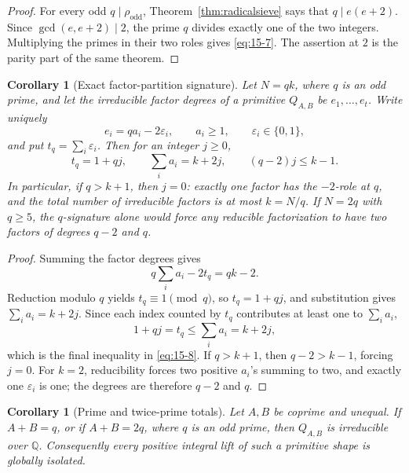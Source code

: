 \documentclass[11pt]{article}
\numberwithin{equation}{section}
\newtheorem{corollary}[theorem]{Corollary}
\theoremstyle{definition}
\newcommand{\Q}{\mathbb Q}
\begin{document}
\begin{proof}
For every odd \(q\mid\rho_{\mathrm{odd}}\),
Theorem~\ref{thm:radicalsieve} says that \(q\mid e(e+2)\).  Since
\(\gcd(e,e+2)\mid2\), the prime \(q\) divides exactly one of the two
integers.  Multiplying the primes in their two roles gives \eqref{eq:15-7}.  The
assertion at \(2\) is the parity part of the same theorem.
\end{proof}

\begin{corollary}[Exact factor-partition signature]
\label{cor:partitionsignature}
Let \(N=qk\), where \(q\) is an odd prime, and let the irreducible factor
degrees of a primitive \(Q_{A,B}\) be \(e_1,\ldots,e_t\).  Write uniquely
\[
 e_i=qa_i-2\varepsilon_i,
 \qquad a_i\geq1,
 \qquad \varepsilon_i\in\{0,1\},
\]
and put \(t_q=\sum_i\varepsilon_i\).  Then for an integer \(j\geq0\),
\begin{equation}
 t_q=1+qj,
 \qquad
 \sum_i a_i=k+2j,
 \qquad
 (q-2)j\leq k-1.
 \label{eq:15-8}
\end{equation}
In particular, if \(q>k+1\), then \(j=0\): exactly one factor has the
\(-2\)-role at \(q\), and the total number of irreducible factors is at
most \(k=N/q\).  If \(N=2q\) with \(q\geq5\), the \(q\)-signature
alone would force any reducible factorization to have two factors of degrees
\(q-2\) and \(q\).
\end{corollary}

\begin{proof}
Summing the factor degrees gives
\[
 q\sum_i a_i-2t_q=qk-2.
\]
Reduction modulo \(q\) yields \(t_q\equiv1\pmod q\), so
\(t_q=1+qj\), and substitution gives \(\sum_i a_i=k+2j\).  Since each
index counted by \(t_q\) contributes at least one to \(\sum_i a_i\),
\[
 1+qj=t_q\leq\sum_i a_i=k+2j,
\]
which is the final inequality in \eqref{eq:15-8}.  If \(q>k+1\), then
\(q-2>k-1\), forcing \(j=0\).  For \(k=2\), reducibility forces two
positive \(a_i\)'s summing to two, and exactly one \(\varepsilon_i\) is
one; the degrees are therefore \(q-2\) and \(q\).
\end{proof}

\begin{corollary}[Prime and twice-prime totals]
\label{cor:prime-totals}
Let \(A,B\) be coprime and unequal.  If \(A+B=q\), or if
\(A+B=2q\), where \(q\) is an odd prime, then \(Q_{A,B}\) is
irreducible over \(\Q\).  Consequently every positive integral lift of
such a primitive shape is globally isolated.
\end{corollary}
\end{document}
